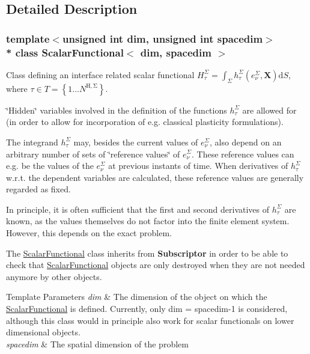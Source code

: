 \subsection{Detailed Description}
\subsubsection*{template$<$unsigned int dim, unsigned int spacedim$>$\\*
class Scalar\+Functional$<$ dim, spacedim $>$}

Class defining an interface related scalar functional $H^\Sigma_\tau = \int_\Sigma h^\Sigma_\tau(e^\Sigma_\nu, \boldsymbol{X}) \mathrm{d}S$, where $\tau \in T=\left\{1 \hdots N^\mathrm{H,\Sigma}\right\}$.

\char`\"{}\+Hidden\char`\"{} variables involved in the definition of the functions $h^\Sigma_\tau$ are allowed for (in order to allow for incorporation of e.\+g. classical plasticity formulations).

The integrand $h^\Sigma_\tau$ may, besides the current values of $e^\Sigma_\nu$, also depend on an arbitrary number of sets of \char`\"{}reference values\char`\"{} of $e^\Sigma_\nu$. These reference values can e.\+g. be the values of the $e^\Sigma_\nu$ at previous instants of time. When derivatives of $h^\Sigma_\tau$ w.\+r.\+t. the dependent variables are calculated, these reference values are generally regarded as fixed.

In principle, it is often sufficient that the first and second derivatives of $h^\Sigma_\tau$ are known, as the values themselves do not factor into the finite element system. However, this depends on the exact problem.

The \hyperlink{class_scalar_functional}{Scalar\+Functional} class inherits from {\bf Subscriptor} in order to be able to check that \hyperlink{class_scalar_functional}{Scalar\+Functional} objects are only destroyed when they are not needed anymore by other objects.


\begin{DoxyTemplParams}{Template Parameters}
{\em dim} & The dimension of the object on which the \hyperlink{class_scalar_functional}{Scalar\+Functional} is defined. Currently, only {\ttfamily dim} = {\ttfamily spacedim-\/1} is considered, although this class would in principle also work for scalar functionals on lower dimensional objects.\\
\hline
{\em spacedim} & The spatial dimension of the problem \\
\hline
\end{DoxyTemplParams}


